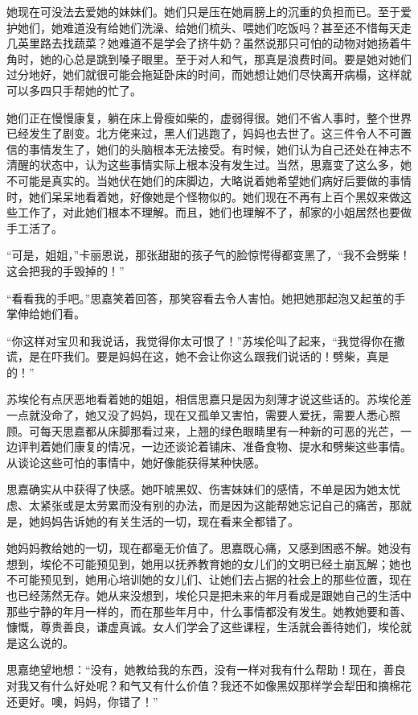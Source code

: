 \par 她现在可没法去爱她的妹妹们。她们只是压在她肩膀上的沉重的负担而已。至于爱护她们，她难道没有给她们洗澡、给她们梳头、喂她们吃饭吗？甚至还不惜每天走几英里路去找蔬菜？她难道不是学会了挤牛奶？虽然说那只可怕的动物对她扬着牛角时，她的心总是跳到嗓子眼里。至于对人和气，那真是浪费时间。要是她对她们过分地好，她们就很可能会拖延卧床的时间，而她想让她们尽快离开病榻，这样就可以多四只手帮她的忙了。
\par 她们正在慢慢康复，躺在床上骨瘦如柴的，虚弱得很。她们不省人事时，整个世界已经发生了剧变。北方佬来过，黑人们逃跑了，妈妈也去世了。这三件令人不可置信的事情发生了，她们的头脑根本无法接受。有时候，她们认为自己还处在神志不清醒的状态中，认为这些事情实际上根本没有发生过。当然，思嘉变了这么多，她不可能是真实的。当她伏在她们的床脚边，大略说着她希望她们病好后要做的事情时，她们呆呆地看着她，好像她是个怪物似的。她们现在不再有上百个黑奴来做这些工作了，对此她们根本不理解。而且，她们也理解不了，郝家的小姐居然也要做手工活了。
\par “可是，姐姐，”卡丽恩说，那张甜甜的孩子气的脸惊愕得都变黑了，“我不会劈柴！这会把我的手毁掉的！”
\par “看看我的手吧。”思嘉笑着回答，那笑容看去令人害怕。她把她那起泡又起茧的手掌伸给她们看。
\par “你这样对宝贝和我说话，我觉得你太可恨了！”苏埃伦叫了起来，“我觉得你在撒谎，是在吓我们。要是妈妈在这，她不会让你这么跟我们说话的！劈柴，真是的！”
\par 苏埃伦有点厌恶地看着她的姐姐，相信思嘉只是因为刻薄才说这些话的。苏埃伦差一点就没命了，她又没了妈妈，现在又孤单又害怕，需要人爱抚，需要人悉心照顾。可每天思嘉都从床脚那看过来，上翘的绿色眼睛里有一种新的可恶的光芒，一边评判着她们康复的情况，一边还谈论着铺床、准备食物、提水和劈柴这些事情。从谈论这些可怕的事情中，她好像能获得某种快感。
\par 思嘉确实从中获得了快感。她吓唬黑奴、伤害妹妹们的感情，不单是因为她太忧虑、太紧张或是太劳累而没有别的办法，而是因为这能帮她忘记自己的痛苦，那就是，她妈妈告诉她的有关生活的一切，现在看来全都错了。
\par 她妈妈教给她的一切，现在都毫无价值了。思嘉既心痛，又感到困惑不解。她没有想到，埃伦不可能预见到，她用以抚养教育她的女儿们的文明已经土崩瓦解；她也不可能预见到，她用心培训她的女儿们、让她们去占据的社会上的那些位置，现在也已经荡然无存。她从来没想到，埃伦只是把未来的年月看成是跟她自己的生活中那些宁静的年月一样的，而在那些年月中，什么事情都没有发生。她教她要和善、慷慨，尊贵善良，谦虚真诚。女人们学会了这些课程，生活就会善待她们，埃伦就是这么说的。
\par 思嘉绝望地想：“没有，她教给我的东西，没有一样对我有什么帮助！现在，善良对我又有什么好处呢？和气又有什么价值？我还不如像黑奴那样学会犁田和摘棉花还更好。噢，妈妈，你错了！”
